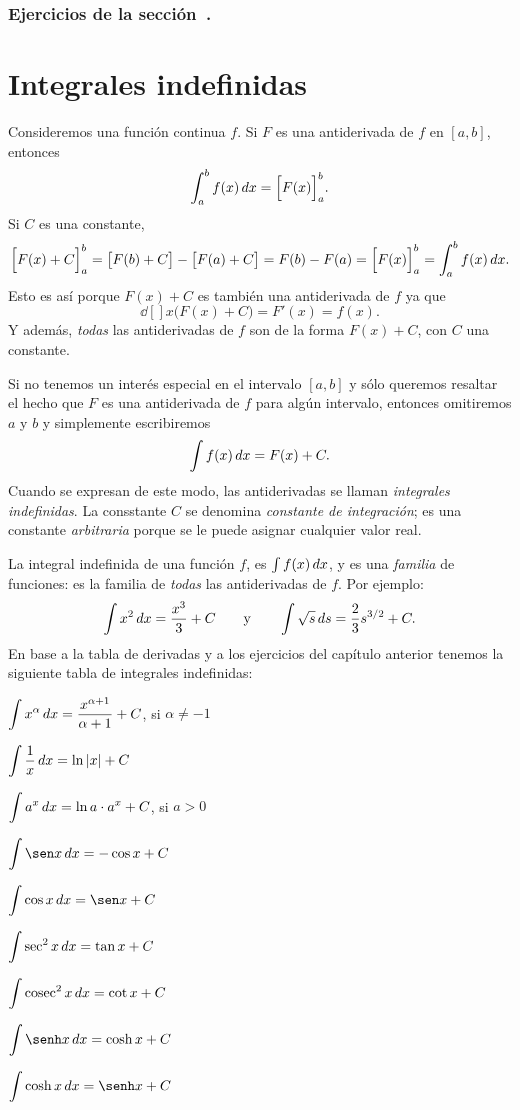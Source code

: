   

\subsubsection*{Ejercicios de la sección~.}

\begin{enumerate}
  
\end{enumerate}  


\section{Integrales indefinidas}

Consideremos una función continua $f$. Si $F$ es una antiderivada de $f$ en $[a,b]$, entonces
\[
\int_a^b f(x)\,dx = \Big[F(x)\Big]_a^b.
\]
Si $C$ es una constante, 
\[
  \Big[F(x)+C\Big]_a^b 
  = \big[F(b)+C\big]-\big[F(a)+C\big]= F(b)-F(a)
  = \Big[F(x)\Big]_a^b = \int_a^b f(x)\,dx.
\]
Esto es así porque $F(x)+C$ es también una antiderivada de $f$ ya que
\[
\dd[]{}{x} \big(F(x)+C\big) = F'(x) = f(x).
\]
Y además, \emph{todas} las antiderivadas de $f$ son de la forma $F(x)+C$, con $C$ una constante.

Si no tenemos un interés especial en el intervalo $[a,b]$ y sólo queremos resaltar el hecho que $F$ es una antiderivada de $f$ para algún intervalo, entonces omitiremos $a$ y $b$ y simplemente escribiremos
\[
\int f(x)\,dx = F(x)+C.
\]
Cuando se expresan de este modo, las antiderivadas se llaman \emph{integrales indefinidas}.
La consstante $C$ se denomina \emph{constante de integración}; es una constante \emph{arbitraria} porque se le puede asignar cualquier valor real.

La integral indefinida de una función $f$, es $\int f(x)\,dx$, y es una \emph{familia} de funciones: es la familia de \emph{todas} las antiderivadas de $f$. Por ejemplo:
\[
\int x^2\,dx = \frac{x^3}{3} + C 
\qquad\text y \qquad
\int \sqrt{s}\,ds = \frac23 s^{3/2}+C.
\]
En base a la tabla de derivadas y a los ejercicios del capítulo anterior tenemos la siguiente tabla de integrales indefinidas:

\begin{multicols}{2}
  $\displaystyle \int x^\alpha \,dx = \frac{x^{\alpha+1}}{\alpha+1} + C$, si $\alpha\neq -1$
  
  $\displaystyle \int \frac1x\,dx = \ln|x| + C$
  
  $\displaystyle \int a^x \,dx = \ln a\cdot a^x  + C$, si $a>0$
  
  $\D \int \sen x\dx = -\cos x + C$
  
  $\D \int \cos x \dx = \sen x + C$
  
  $\displaystyle \int \sec^2 x\,dx = \tan x + C$
  
  $\displaystyle \int \operatorname{cosec}^2 x\,dx = \cot x + C$
  
  $\D \int \senh x \dx = \cosh x + C$
  
  $\D \int \cosh x \dx = \senh x + C$
  
\end{multicols}

